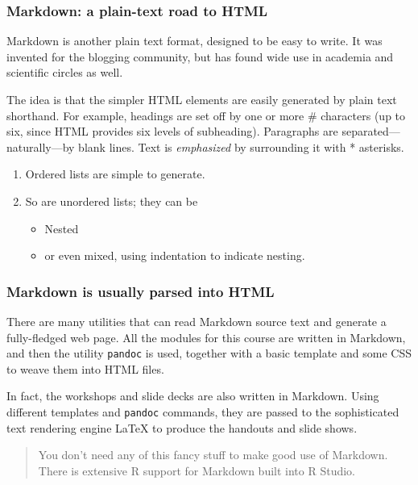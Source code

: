 \documentclass[11pt,ignorenonframetext,aspectratio=169]{beamer}
\begin{document}
\begin{frame}\frametitle{Markdown: a plain-text road to HTML}

Markdown is another plain text format, designed to be easy to write. It
was invented for the blogging community, but has found wide use in
academia and scientific circles as well.

The idea is that the simpler HTML elements are easily generated by plain
text shorthand. For example, headings are set off by one or more \#
characters (up to six, since HTML provides six levels of subheading).
Paragraphs are separated---naturally---by blank lines. Text is
\emph{emphasized} by surrounding it with * asterisks.

\begin{enumerate}[<+->]
\def\labelenumi{\arabic{enumi}.}

\item
  Ordered lists are simple to generate.
\item
  So are unordered lists; they can be

  \begin{itemize}[<+->]
  
  \item
    Nested
  \item
    or even mixed, using indentation to indicate nesting.
  \end{itemize}
\end{enumerate}

\end{frame}

\begin{frame}\frametitle{Markdown is usually parsed into HTML}

There are many utilities that can read Markdown source text and generate
a fully-fledged web page. All the modules for this course are written in
Markdown, and then the utility \texttt{pandoc} is used, together with a
basic template and some CSS to weave them into HTML files.

In fact, the workshops and slide decks are also written in Markdown.
Using different templates and \texttt{pandoc} commands, they are passed
to the sophisticated text rendering engine LaTeX to produce the handouts
and slide shows.

\begin{quote}
You don't need any of this fancy stuff to make good use of Markdown.
There is extensive R support for Markdown built into R Studio.
\end{quote}

\end{frame}
\end{document}
